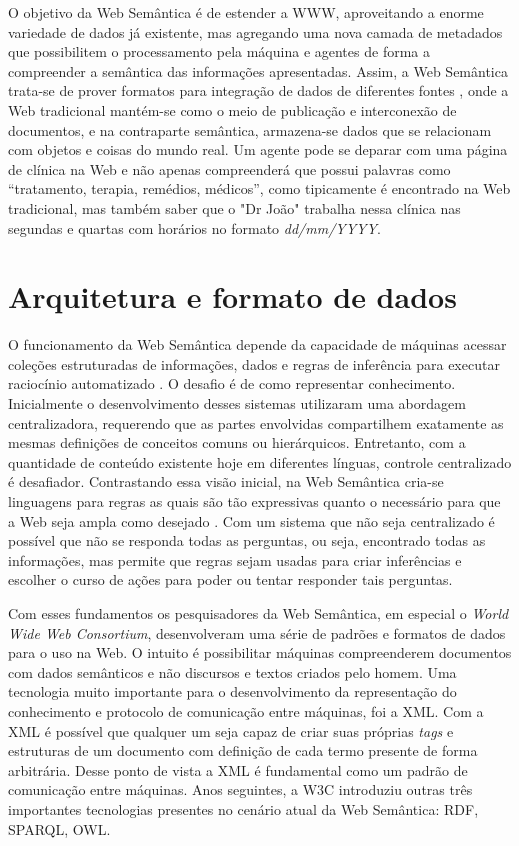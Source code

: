 O objetivo da Web Semântica é de estender a WWW, aproveitando a enorme variedade de dados já existente, mas agregando uma nova camada de metadados que possibilitem o processamento pela máquina e agentes de forma a compreender a semântica das informações apresentadas. Assim, a Web Semântica trata-se de prover formatos para integração de dados de diferentes fontes \citep{SemanticWebW3C}, onde a Web tradicional mantém-se como o meio de publicação e interconexão de documentos, e na contraparte semântica, armazena-se dados que se relacionam com objetos e coisas do mundo real. Um agente pode se deparar com uma página de clínica na Web e não apenas compreenderá que possui palavras como “tratamento, terapia, remédios, médicos”, como tipicamente é encontrado na Web tradicional, mas também saber que o "Dr João" trabalha nessa clínica nas segundas e quartas com horários no formato \textit{dd/mm/YYYY}.

\section{Arquitetura e formato de dados}

O funcionamento da Web Semântica depende da capacidade de máquinas acessar coleções estruturadas de informações, dados e regras de inferência para executar raciocínio automatizado \citep{bernerslee2001semantic}. O desafio é de como representar conhecimento. Inicialmente o desenvolvimento desses sistemas utilizaram uma abordagem centralizadora, requerendo que as partes envolvidas compartilhem exatamente as mesmas definições de conceitos comuns ou hierárquicos. Entretanto, com a quantidade de conteúdo existente hoje em diferentes línguas, controle centralizado é desafiador. Contrastando essa visão inicial, na Web Semântica cria-se linguagens para regras as quais são tão expressivas quanto o necessário para que a Web seja ampla como desejado \citep{bernerslee2001semantic}. Com um sistema que não seja centralizado é possível que não se responda todas as perguntas, ou seja, encontrado todas as informações, mas permite que regras sejam usadas para criar inferências e escolher o curso de ações para poder ou tentar responder tais perguntas.

Com esses fundamentos os pesquisadores da Web Semântica, em especial o \textit{World Wide Web Consortium}, desenvolveram uma série de padrões e formatos de dados para o uso na Web. O intuito é possibilitar máquinas compreenderem documentos com dados semânticos e não discursos e textos criados pelo homem. Uma tecnologia muito importante para o desenvolvimento da representação do conhecimento e protocolo de comunicação entre máquinas, foi a \ac{XML}. Com a XML é possível que qualquer um seja capaz de criar suas próprias \textit{tags} e estruturas de um documento com definição de cada termo presente de forma arbitrária. Desse ponto de vista a XML é fundamental como um padrão de comunicação entre máquinas. Anos seguintes, a W3C introduziu outras três importantes tecnologias presentes no cenário atual da Web Semântica: \ac{RDF}, \ac{SPARQL}, \ac{OWL}.


